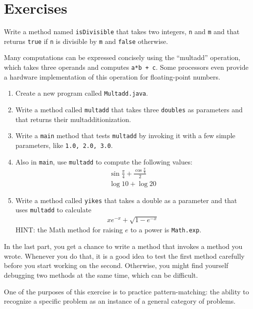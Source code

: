 \section{Exercises}

\begin{exercise}
\label{ex.isdiv}

Write a method named {\tt isDivisible} that takes
two integers, {\tt n} and {\tt m} and that returns {\tt true}
if {\tt n} is divisible by {\tt m} and {\tt false} otherwise.

\end{exercise}


\begin{exercise}
\label{ex.multadd}

Many computations can be expressed concisely using the ``multadd''
operation, which takes three operands and computes {\tt a*b + c}.  Some
processors even provide a hardware implementation of this operation for
floating-point numbers.

\begin{enumerate}

\item Create a new program called {\tt Multadd.java}.

\item Write a method called {\tt multadd} that takes three {\tt doubles}
as parameters and that returns their multadditionization.

\item Write a {\tt main} method that tests {\tt multadd} by invoking it with a
few simple parameters, like {\tt 1.0, 2.0, 3.0}.

\item Also in {\tt main}, use {\tt multadd} to compute the
following values:
%
\begin{eqnarray*}
& \sin \frac{\pi}{4} + \frac{\cos \frac{\pi}{4}}{2} & \\
& \log 10 + \log 20 &
\end{eqnarray*}
%
\item Write a method called {\tt yikes} that takes a
double as a parameter and that uses {\tt multadd} to calculate
%
\begin{eqnarray*}
x e^{-x} + \sqrt{1 - e^{-x}}
\end{eqnarray*}
%
HINT: the Math method for raising $e$ to a power is {\tt Math.exp}.

\end{enumerate}

In the last part, you get a chance to write a method that invokes
a method you wrote.  Whenever you do that, it is a good idea to
test the first method carefully before you start working on the
second.  Otherwise, you might find yourself debugging two methods
at the same time, which can be difficult.

One of the purposes of this exercise is to practice pattern-matching:
the ability to recognize a specific problem as an instance of a
general category of problems.

\end{exercise}


